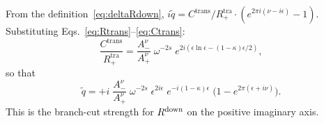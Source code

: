 \documentclass[12pt,a4paper]{article}
\begin{document}
From the definition~\eqref{eq:deltaRdown},
$i\tilde{q} = C^{\mathrm{trans}}/R^{\mathrm{tra}}_+\cdot
(e^{2\pi i(\nu-i\epsilon)}-1)$.
Substituting Eqs.~\eqref{eq:Rtrans}--\eqref{eq:Ctrans}:
\begin{equation}
  \frac{C^{\mathrm{trans}}}{R^{\mathrm{tra}}_+}
  = \frac{A^\nu_-}{A^\nu_+}\;\omega^{-2s}\;
    e^{2i(\epsilon\ln\epsilon - (1-\kappa)\epsilon/2)},
  \label{eq:Ctrans_over_Rtrans}
\end{equation}
so that
\begin{equation}
  \boxed{
    \tilde{q} = +i\;\frac{A^\nu_-}{A^\nu_+}\;\omega^{-2s}\;
    \epsilon^{2i\epsilon}\;e^{-i(1-\kappa)\epsilon}\;
    \bigl(1 - e^{2\pi(\epsilon + i\nu)}\bigr).
  }
  \label{eq:qtilde_final}
\end{equation}
This is the branch-cut strength for $R^{\rm down}$ on the positive
imaginary axis.
\end{document}
